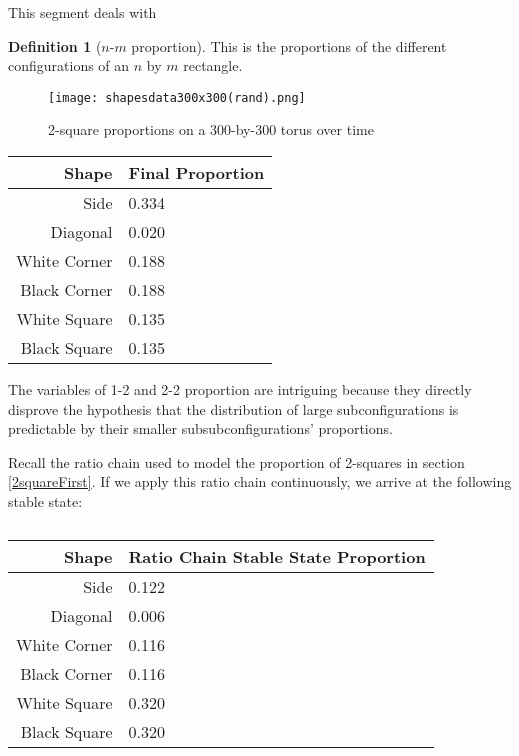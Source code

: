 \documentclass[12pt]{article}
\theoremstyle{definition}
\newtheorem{definition}{Definition}%
\theoremstyle{remark}
\theoremstyle{remark}
\begin{document}
\par
This segment deals with 

\begin{definition}[$n$-$m$ proportion]
This is the proportions of the different configurations of an $n$ by $m$ rectangle.
\end{definition}

\begin{figure}[H]
  \texttt{[image: shapesdata300x300(rand).png]}
  \caption{2-square proportions on a 300-by-300 torus over time}
\end{figure}

\begin{table}[H]
\begin{tabular}{r|l}
  Shape & Final Proportion \\ \hline
  Side & 0.334 \\
  Diagonal & 0.020 \\
  White Corner & 0.188 \\
  Black Corner & 0.188 \\
  White Square & 0.135 \\
  Black Square & 0.135 \\  
\end{tabular}
\end{table}

\par
The variables of 1-2 and 2-2 proportion are intriguing because they directly disprove the hypothesis that the distribution of large subconfigurations is predictable by their smaller subsubconfigurations' proportions. %


\par
Recall the ratio chain used to model the proportion of 2-squares in section \ref{2squareFirst}. If we apply this ratio chain continuously, we arrive at the following stable state:
\begin{table}[H]
\begin{tabular}{r|l}
  Shape & Ratio Chain Stable State Proportion \\ \hline
  Side & 0.122 \\
  Diagonal & 0.006 \\
  White Corner & 0.116 \\
  Black Corner & 0.116 \\
  White Square & 0.320 \\
  Black Square & 0.320 \\
\end{tabular}
\caption{}
\end{table}
\end{document}
